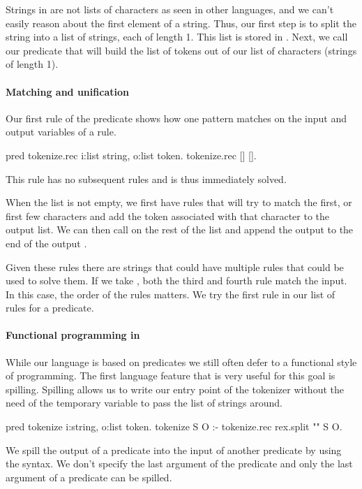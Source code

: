 \documentclass[thesis.tex]{subfiles}
\begin{document}
{{Strings in \elpi are not lists of characters as seen in other languages, and we can't easily reason about the first element of a string. Thus, our first step is to split the string into a list of strings, each of length 1. This list is stored in . Next, we call our predicate that will build the list of tokens out of our list of characters (strings of length 1).

\paragraph*{Matching and unification}
Our first rule of the  predicate shows how one pattern matches on the input and output variables of a rule.
\begin{elpicode}
  pred tokenize.rec i:list string, o:list token.
  tokenize.rec [] [].
\end{elpicode}
This rule has no subsequent rules and is thus immediately solved.

When the list is not empty, we first have rules that will try to match the first, or first few characters and add the token associated with that character to the output list. We can then call  on the rest of the list and append the output to the end of the output .
Given these rules there are strings that could have multiple rules that could be used to solve them. If we take \elpiinline{["/", "/", "="]}, both the third and fourth rule match the input. In this case, the order of the rules matters. We try the first rule in our list of rules for a predicate.

\paragraph*{Functional programming in \elpi}
While our language is based on predicates we still often defer to a functional style of programming. The first language feature that is very useful for this goal is spilling. Spilling allows us to write our entry point of the tokenizer without the need of the temporary variable to pass the list of strings around.
\begin{elpicode}
  pred tokenize i:string, o:list token.
  tokenize S O :- tokenize.rec {rex.split "" S} O.
\end{elpicode}
We spill the output of a predicate into the input of another predicate by using the \elpiinline{{ }} syntax. We don't specify the last argument of the predicate and only the last argument of a predicate can be spilled.

}}
\end{document}
